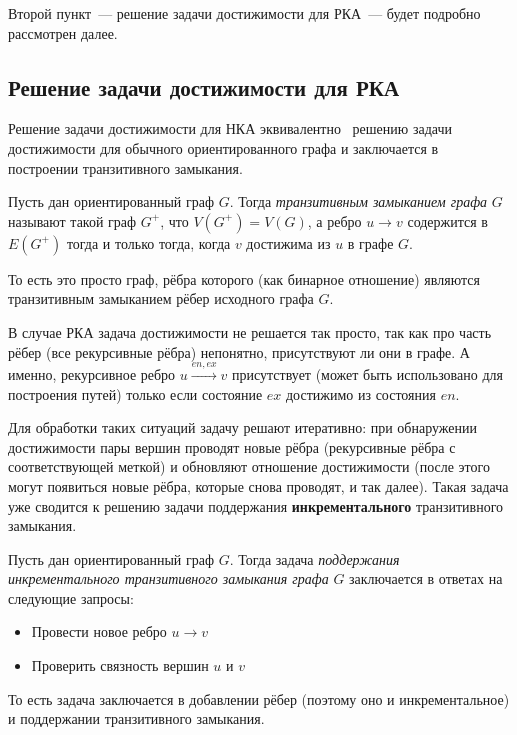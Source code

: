 Второй пункт~--- решение задачи достижимости для РКА~--- будет подробно рассмотрен далее.

\subsection{Решение задачи достижимости для РКА}

Решение задачи достижимости для НКА эквивалентно~\cite{Yannakakis1990} решению задачи достижимости для обычного ориентированного графа и заключается в построении транзитивного замыкания.

\begin{definition}\label{def:TC}
  Пусть дан ориентированный граф $G$. Тогда \textit{транзитивным замыканием графа} $G$ называют такой граф $G^{+}$, что $V(G^{+}) = V(G)$, а ребро $u \to v$ содержится в $E(G^{+})$ тогда и только тогда, когда $v$ достижима из $u$ в графе $G$. 

  То есть это просто граф, рёбра которого (как бинарное отношение) являются транзитивным замыканием рёбер исходного графа $G$.
\end{definition}

В случае РКА задача достижимости не решается так просто, так как про часть рёбер (все рекурсивные рёбра) непонятно, присутствуют ли они в графе. А именно, рекурсивное ребро $u \xrightarrow{en, ex} v$ присутствует (может быть использовано для построения путей) только если состояние $ex$ достижимо из состояния $en$.

Для обработки таких ситуаций задачу решают итеративно: при обнаружении достижимости пары вершин проводят новые рёбра (рекурсивные рёбра с соответствующей меткой) и обновляют отношение достижимости (после этого могут появиться новые рёбра, которые снова проводят, и так далее). Такая задача уже сводится к решению задачи поддержания {\bf инкрементального} транзитивного замыкания.

\begin{definition}
  Пусть дан ориентированный граф $G$. Тогда задача \textit{поддержания инкрементального транзитивного замыкания графа} $G$ заключается в ответах на следующие запросы:
  \vspace{-\topsep}
  \begin{itemize}
    \setlength\itemsep{-0.1em}
    \item Провести новое ребро $u \to v$
    \item Проверить связность вершин $u$ и $v$
  \end{itemize}

  То есть задача заключается в добавлении рёбер (поэтому оно и инкрементальное) и поддержании транзитивного замыкания.
\end{definition}

